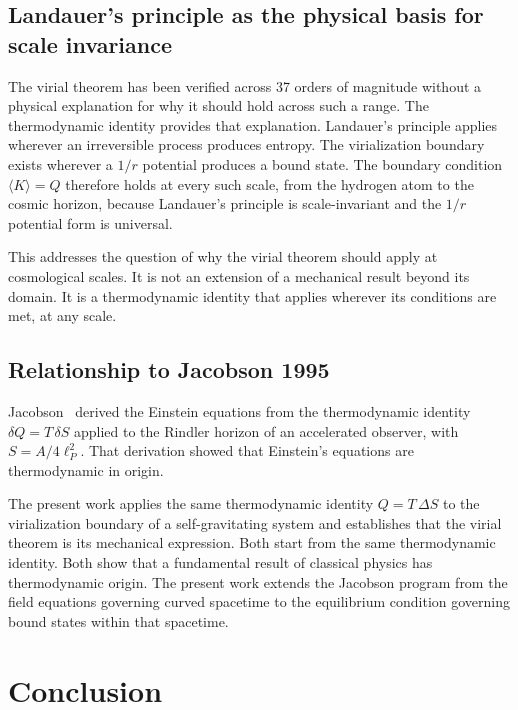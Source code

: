 \documentclass[12pt,a4paper]{article}
\begin{document}
\subsection{Landauer's principle as the physical basis for scale invariance}

The virial theorem has been verified across 37 orders of magnitude without
a physical explanation for why it should hold across such a range. The
thermodynamic identity provides that explanation. Landauer's principle
applies wherever an irreversible process produces entropy. The
virialization boundary exists wherever a $1/r$ potential produces a bound
state. The boundary condition $\langle K \rangle = Q$ therefore holds at
every such scale, from the hydrogen atom to the cosmic horizon, because
Landauer's principle is scale-invariant and the $1/r$ potential form is
universal.

This addresses the question of why the virial theorem should apply at
cosmological scales. It is not an extension of a mechanical result beyond
its domain. It is a thermodynamic identity that applies wherever its
conditions are met, at any scale.

\subsection{Relationship to Jacobson 1995}

Jacobson~\citet{Jacobson1995} derived the Einstein equations from
the thermodynamic identity $\delta Q = T\,\delta S$ applied to the Rindler
horizon of an accelerated observer, with $S = A/4\ell_P^2$. That
derivation showed that Einstein's equations are thermodynamic in origin.

The present work applies the same thermodynamic identity
$Q = T\,\Delta S$ to the virialization boundary of a self-gravitating
system and establishes that the virial theorem is its mechanical
expression. Both start from the same thermodynamic identity. Both show
that a fundamental result of classical physics has thermodynamic origin.
The present work extends the Jacobson program from the field equations
governing curved spacetime to the equilibrium condition governing bound
states within that spacetime.

\section{Conclusion}
\label{sec:conclusion}
\end{document}
